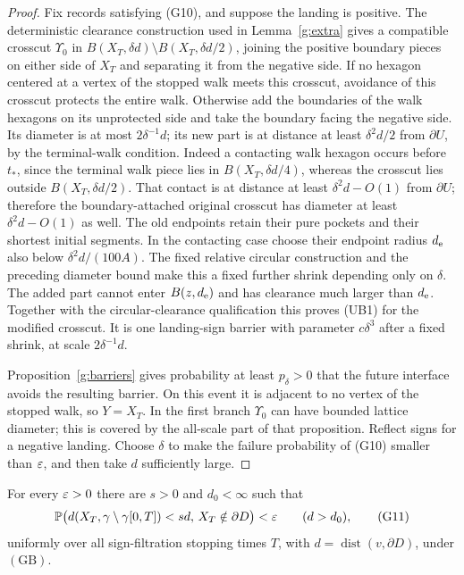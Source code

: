 \begin{proof}
Fix records satisfying (G10), and suppose the landing is positive.
The deterministic clearance construction used in
Lemma~\ref{g:extra} gives a compatible crosscut \(\Upsilon_0\)
in \(B(X_T,\delta d)\setminus B(X_T,\delta d/2)\), joining the
positive boundary pieces on either side of \(X_T\) and separating
it from the negative side. If no hexagon centered at a vertex of the
stopped walk meets this crosscut,
avoidance of this crosscut protects the entire walk.
Otherwise add the boundaries of the walk hexagons on its
unprotected side and take the boundary facing the negative side.
Its diameter is at most \(2\delta^{-1}d\); its new part is at
distance at least \(\delta^2d/2\) from \(\partial U\), by the
terminal-walk condition. Indeed a contacting walk hexagon occurs
before \(t_*\), since the terminal walk piece lies in
\(B(X_T,\delta d/4)\), whereas the crosscut lies outside
\(B(X_T,\delta d/2)\). That contact is at distance at least \(\delta^2d-O(1)\)
from \(\partial U\); therefore the boundary-attached original
crosscut has diameter at least \(\delta^2d-O(1)\) as well.
The old endpoints retain their pure pockets and their shortest
initial segments. In the contacting case choose their endpoint
radius \(d_{\rm e}\) also below \(\delta^2d/(100A)\).
The fixed relative circular construction and the preceding diameter
bound make this a fixed further shrink depending only on \(\delta\).
The added part cannot enter \(B(z,d_{\rm e})\) and has clearance
much larger than \(d_{\rm e}\). Together with the circular-clearance
qualification this proves (UB1) for the modified crosscut.
It is one landing-sign barrier with parameter \(c\delta^3\)
after a fixed shrink, at scale \(2\delta^{-1}d\).

Proposition~\ref{g:barriers} gives probability at least \(p_\delta>0\)
that the future interface avoids the resulting barrier. On this
event it is adjacent to no vertex of the stopped walk, so \(Y=X_T\).
In the first branch \(\Upsilon_0\) can have bounded lattice diameter;
this is covered by the all-scale part of that proposition.
Reflect signs for a negative landing. Choose \(\delta\) to make
the failure probability of (G10) smaller than \(\varepsilon\), and then
take \(d\) sufficiently large.
\end{proof}

\begin{proposition}
\label{g:nonreturn}
For every \(\varepsilon>0\) there are \(s>0\) and \(d_0<\infty\) such that
\[
 \mathbb P\bigl(d(X_T,\gamma\setminus\gamma[0,T])<s d,\,
                  X_T\notin\partial D\bigr)<\varepsilon
 \qquad(d>d_0),                                      \tag{G11}
\]
uniformly over all sign-filtration stopping times \(T\), with
\(d=\operatorname{dist}(v,\partial D)\), under \((\mathrm{GB})\).
\end{proposition}

